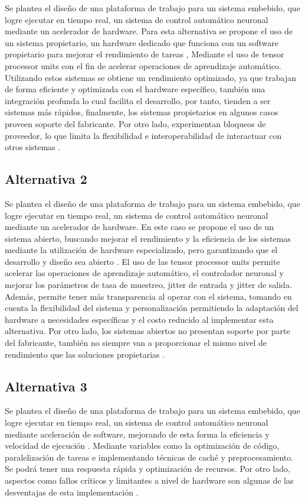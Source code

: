 \documentclass[12pt]{article}
\begin{document}
Se plantea el diseño de una plataforma de trabajo para un sistema embebido, que logre ejecutar en tiempo real, un sistema de control automático neuronal mediante un acelerador de hardware. Para esta alternativa se propone el uso de un sistema propietario, un hardware dedicado que funciona con un software propietario para mejorar el rendimiento de tareas\cite{zhao2017hardware} \cite{shi2011vcuda}, Mediante el uso de tensor processor units con el fin de acelerar operaciones de aprendizaje automático. Utilizando estos sistemas se obtiene un rendimiento optimizado, ya que trabajan de forma eficiente y optimizada con el hardware específico, también una integración profunda lo cual facilita el desarrollo, por tanto, tienden a ser sistemas más rápidos, finalmente, los sistemas propietarios en algunos casos proveen soporte del fabricante. Por otro lado, experimentan bloqueos de proveedor, lo que limita la flexibilidad e interoperabilidad de interactuar con otros sistemas \cite{deng2020model} \cite{duato2011enabling}.

\subsection{Alternativa 2}

Se plantea el diseño de una plataforma de trabajo para un sistema embebido, que logre ejecutar en tiempo real, un sistema de control automático neuronal mediante un acelerador de hardware. En este caso se propone el uso de un sistema abierto, buscando mejorar el rendimiento y la eficiencia de los sistemas mediante la utilización de hardware especializado, pero garantizando que el desarrollo y diseño sea abierto \cite{scarpino2011opencl} \cite{owaida2011massively}. El uso de las tensor processor units permite acelerar las operaciones de aprendizaje automático, el controlador neuronal y mejorar los parámetros de tasa de muestreo, jitter de entrada y jitter de salida. Además, permite tener más transparencia al operar con el sistema, tomando en cuenta la flexibilidad del sistema y personalización permitiendo la adaptación del hardware a necesidades específicas y el costo reducido al implementar esta alternativa. Por otro lado, los sistemas abiertos no presentan soporte por parte del fabricante, también no siempre van a proporcionar el mismo nivel de rendimiento que las soluciones propietarias \cite{meyer2020evaluating} \cite{verma2016accelerating}.

\subsection{Alternativa 3}
Se plantea el diseño de una plataforma de trabajo para un sistema embebido, que logre ejecutar en tiempo real, un sistema de control automático neuronal mediante aceleración de software, mejorando de esta forma la eficiencia y velocidad de ejecución \cite{galan2000control}. Mediante variables como la optimización de código, paralelización de tareas e implementando técnicas de caché y preprocesamiento. Se podrá tener una respuesta rápida y optimización de recursos. Por otro lado, aspectos como fallos críticos y limitantes a nivel de hardware son algunas de las desventajas de esta implementación \cite{kim1994software} \cite{razdan1994prisc}.
\end{document}
